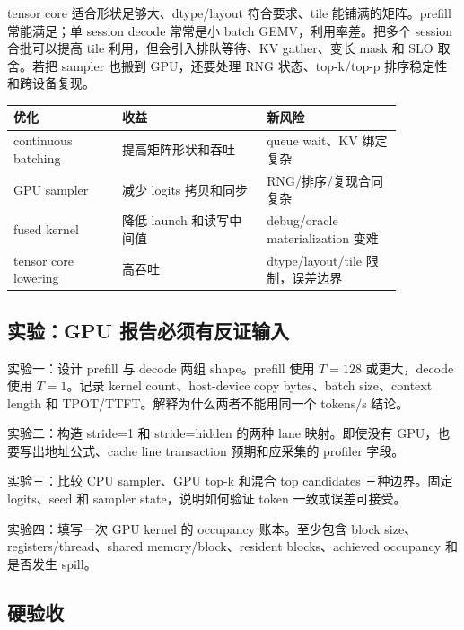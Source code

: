tensor core 适合形状足够大、dtype/layout 符合要求、tile 能铺满的矩阵。prefill 常能满足；单 session decode 常常是小 batch GEMV，利用率差。把多个 session 合批可以提高 tile 利用，但会引入排队等待、KV gather、变长 mask 和 SLO 取舍。若把 sampler 也搬到 GPU，还要处理 RNG 状态、top-k/top-p 排序稳定性和跨设备复现。

\begin{center}
\begin{tabular}{p{0.24\linewidth}p{0.32\linewidth}p{0.30\linewidth}}
\toprule
优化 & 收益 & 新风险 \\
\midrule
continuous batching & 提高矩阵形状和吞吐 & queue wait、KV 绑定复杂 \\
GPU sampler & 减少 logits 拷贝和同步 & RNG/排序/复现合同复杂 \\
fused kernel & 降低 launch 和读写中间值 & debug/oracle materialization 变难 \\
tensor core lowering & 高吞吐 & dtype/layout/tile 限制，误差边界 \\
\bottomrule
\end{tabular}
\end{center}

\subsection{实验：GPU 报告必须有反证输入}

\begin{exercisebox}
实验一：设计 prefill 与 decode 两组 shape。prefill 使用 \(T=128\) 或更大，decode 使用 \(T=1\)。记录 kernel count、host-device copy bytes、batch size、context length 和 TPOT/TTFT。解释为什么两者不能用同一个 tokens/s 结论。

实验二：构造 stride=1 和 stride=hidden 的两种 lane 映射。即使没有 GPU，也要写出地址公式、cache line transaction 预期和应采集的 profiler 字段。

实验三：比较 CPU sampler、GPU top-k 和混合 top candidates 三种边界。固定 logits、seed 和 sampler state，说明如何验证 token 一致或误差可接受。

实验四：填写一次 GPU kernel 的 occupancy 账本。至少包含 block size、registers/thread、shared memory/block、resident blocks、achieved occupancy 和是否发生 spill。
\end{exercisebox}

\subsection{硬验收}

